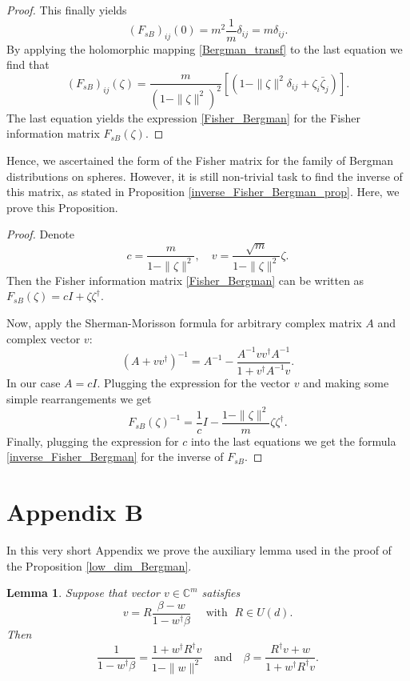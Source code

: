 \documentclass{article}
\theoremstyle{plain}%
\newtheorem{lemma}[theorem]{Lemma}
\theoremstyle{definition}
\theoremstyle{remark}
\theoremstyle{prop}
\begin{document}
\begin{appendices}
\begin{proof}
This finally yields
$$
(F_{sB})_{ij}(0) = m^2 \frac{1}{m} \delta_{ij} = m \delta_{ij}.
$$
By applying the holomorphic mapping \eqref{Bergman_transf} to the last equation we find that
$$
(F_{sB})_{ij}(\zeta) = \frac{m}{(1 - \| \zeta \|^2)^2} \left[(1 - \| \zeta \|^2 \delta_{ij} + \zeta_i \bar \zeta_j ) \right].  
$$
The last equation yields the expression \eqref{Fisher_Bergman} for the Fisher information matrix $F_{sB}(\zeta)$.
\end{proof}

Hence, we ascertained the form of the Fisher matrix for the family of Bergman distributions on spheres. However, it is still non-trivial task to find the inverse of this matrix, as stated in Proposition \ref{inverse_Fisher_Bergman_prop}. Here, we prove this Proposition.

\begin{proof}

Denote 
$$
c = \frac{m}{1 - \| \zeta \|^2}, \quad v = \frac{\sqrt{m}}{1- \| \zeta \|^2} \zeta.
$$
Then the Fisher information matrix \eqref{Fisher_Bergman} can be written as $F_{sB}(\zeta) = c I + \zeta \zeta^\dagger$. 

Now, apply the Sherman-Morisson formula \cite{SM} for arbitrary complex matrix $A$ and complex vector $v$:  
$$
(A + v v^\dagger)^{-1} = A^{-1} - \frac{A^{-1}v v^\dagger A^{-1}}{1 + v^\dagger A^{-1} v}.
$$
In our case $A = c I$. Plugging the expression for the vector $v$ and making some simple rearrangements we get
$$
F_{sB}(\zeta)^{-1} = \frac{1}{c} I - \frac{1 -\| \zeta \|^2}{m} \zeta \zeta^\dagger.
$$ 
Finally, plugging the expression for $c$ into the last equations we get the formula \eqref{inverse_Fisher_Bergman} for the inverse of $F_{sB}$.
\end{proof}

\section{Appendix B}

In this very short Appendix we prove the auxiliary lemma used in the proof of the Proposition \ref{low_dim_Bergman}.

\begin{lemma}
Suppose that vector $v \in {\mathbb C}^m$ satisfies
\begin{equation}
\label{Moebius_lemma}
v = R \frac{\beta - w}{1 - w^\dagger \beta} \quad \mbox{  with } \; R \in U(d).
\end{equation}
Then
\begin{equation}
\label{identity1}
\frac{1}{1 - w^\dagger \beta} = \frac{1 + w^\dagger R^\dagger v}{1 - \| w\|^2} \quad \mbox{and} \quad 
\beta = \frac{R^\dagger v + w}{1 + w^\dagger R^\dagger v}.
\end{equation}
\end{lemma}


\end{appendices}
\end{document}
